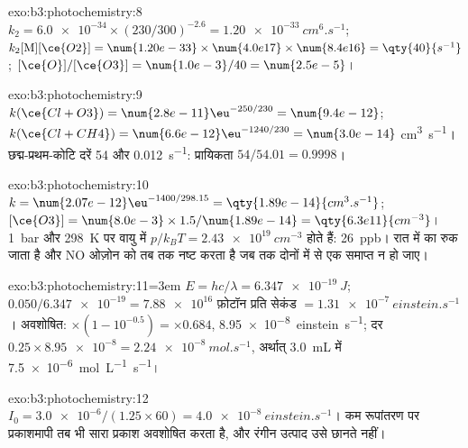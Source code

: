 \begin{solution}{exo:b3:photochemistry:8}
$k_2 = \num{6.0e-34} \times (230/300)^{-2.6} = \qty{1.20e-33}{cm^6.s^{-1}}$; $k_2[\mathrm M][\ce{O2}] = \num{1.20e-33} \times
\num{4.0e17} \times \num{8.4e16} = \qty{40}{s^{-1}}$; $[\ce{O}]/[\ce{O3}] = \num{1.0e-3}/40 = \num{2.5e-5}$।
\end{solution}

\begin{solution}{exo:b3:photochemistry:9}
$k(\ce{Cl + O3}) = \num{2.8e-11}\eu^{-250/230} = \num{9.4e-12}$; $k(\ce{Cl + CH4}) = \num{6.6e-12}\eu^{-1240/230} = \num{3.0e-14}$
\unit{cm^3.s^{-1}}। छद्म-प्रथम-कोटि दरें 54 और \qty{0.012}{s^{-1}}: प्रायिकता $54/54.01 = 0.9998$।
\end{solution}

\begin{solution}{exo:b3:photochemistry:10}
$k = \num{2.07e-12}\eu^{-1400/298.15} = \qty{1.89e-14}{cm^3.s^{-1}}$; $[\ce{O3}] = \num{8.0e-3} \times 1.5/\num{1.89e-14} =
\qty{6.3e11}{cm^{-3}}$। \qty{1}{bar} और \qty{298}{K} पर वायु में $p/k_BT = \qty{2.43e19}{cm^{-3}}$ होते हैं: \qty{26}{ppb}। रात में
 का  रुक जाता है और NO ओज़ोन को तब तक नष्ट करता है जब तक दोनों में से एक समाप्त न हो जाए।
\end{solution}

\begin{solution}{exo:b3:photochemistry:11}\emergencystretch=3em
$E = hc/\lambda = \qty{6.347e-19}{J}$; $0.050/\num{6.347e-19} = \num{7.88e16}$ फ़ोटॉन प्रति सेकंड $= \qty{1.31e-7}{einstein.s^{-1}}$।
अवशोषित: $\times(1 - 10^{-0.5}) = \times0.684$, \qty{8.95e-8}{einstein.s^{-1}}; दर $0.25 \times \num{8.95e-8} =
\qty{2.24e-8}{mol.s^{-1}}$, अर्थात् \qty{3.0}{mL} में \qty{7.5e-6}{mol.L^{-1}.s^{-1}}।
\end{solution}

\begin{solution}{exo:b3:photochemistry:12}
$I_0 = \num{3.0e-6}/(1.25 \times 60) = \qty{4.0e-8}{einstein.s^{-1}}$। कम रूपांतरण पर प्रकाशमापी
तब भी सारा प्रकाश अवशोषित करता है, और रंगीन उत्पाद उसे छानते नहीं।
\end{solution}

